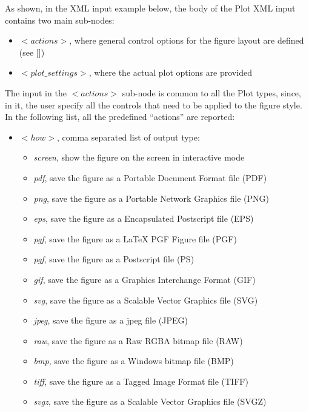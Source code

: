 As shown, in the XML input example below, the body of the Plot XML input contains two main sub-nodes:
\vspace{-5mm}
\begin{itemize}
\itemsep0em
\item$<actions>$, where general control options for the figure layout are defined (see [])
\item $<plot\_settings>$, where the actual plot options are provided
\vspace{-5mm}
\end{itemize}
The input in the $<actions>$ sub-node is common to all the Plot types, since, in it, the user specify all the controls that need to be applied to the figure style. In the following list, all the predefined ``actions'' are reported:
 \vspace{-5mm}
\begin{itemize}
\itemsep0em
\item $<how>$, comma separated list of output type:
     \begin{itemize}
        \item \textit{screen}, show the figure on the screen in interactive mode
        \item \textit{pdf}, save the figure as a Portable Document Format file (PDF)
        \item \textit{png}, save the figure as a Portable Network Graphics file (PNG)
        \item \textit{eps}, save the figure as a Encapsulated Postscript file (EPS)
        \item \textit{pgf}, save the figure as a LaTeX PGF Figure file (PGF)
        \item \textit{pgf}, save the figure as a Postscript file (PS)
        \item \textit{gif}, save the figure as a Graphics Interchange Format (GIF)
        \item \textit{svg}, save the figure as a Scalable Vector Graphics file (SVG)
        \item \textit{jpeg}, save the figure as a jpeg file (JPEG)
        \item \textit{raw}, save the figure as a Raw RGBA bitmap file (RAW)
        \item \textit{bmp}, save the figure as a Windows bitmap file (BMP)
        \item \textit{tiff}, save the figure as a Tagged Image Format  file (TIFF)
        \item \textit{svgz}, save the figure as a Scalable Vector Graphics file (SVGZ)

\end{itemize}
\end{itemize}
